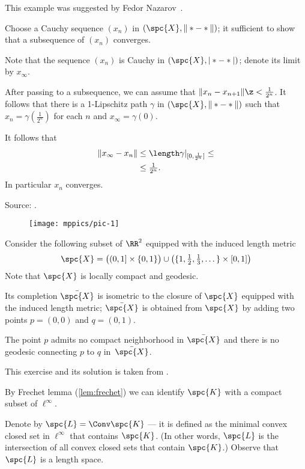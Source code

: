 This example was suggested by Fedor Nazarov~\cite{nazarov}.

Choose a Cauchy sequence $(x_n)$ in $(\spc{X},\|*-*\|)$; it sufficient to show that a subsequence of $(x_n)$ converges.

Note that the sequence $(x_n)$ is Cauchy in $(\spc{X},|*-*|)$;
denote its limit by $x_\infty$.

After passing to a subsequence, we can assume that $\|x_n-x_{n+1}\|\z<\tfrac1{2^n}$.
It follows that there is a 1-Lipschitz path $\gamma$ in $(\spc{X},\|*-*\|)$ such that $x_n=\gamma(\tfrac1{2^n})$ for each $n$ and $x_\infty=\gamma(0)$.

It follows that
\begin{align*}
\|x_\infty-x_n\|&\le \length\gamma|_{[0,\frac1{2^n}]}\le
\\
&\le \tfrac1{2^n}.
\end{align*}
In particular $x_n$ converges.\qeds

Source: \cite[Lemma 2.3]{petrunin-stadler}.


\begin{wrapfigure}{o}{20 mm}
\vskip-0mm
\centering
\texttt{[image: mppics/pic-1]}
\end{wrapfigure}

Consider the following subset of $\RR^2$ equipped with the induced length metric
\[
\spc{X}
=
\bigl((0,1]\times\{0,1\}\bigr)
\cup
\bigl(\{1,\tfrac12,\tfrac13,\dots\}\times[0,1]\bigr)
\]
Note that $\spc{X}$ is locally compact and geodesic.

Its completion $\bar{\spc{X}}$ is isometric to the closure of $\spc{X}$ equipped with the induced length metric;
$\bar{\spc{X}}$ is obtained from $\spc{X}$ by adding two points $p=(0,0)$ and $q=(0,1)$.

The point $p$ admits no compact neighborhood in $\bar{\spc{X}}$ 
and there is no geodesic connecting $p$ to $q$ in~$\bar{\spc{X}}$. \qeds

This exercise and its solution is taken from \cite{bridson-haefliger}.


 By Frechet lemma (\ref{lem:frechet}) we can identify $\spc{K}$ with a compact subset of $\ell^\infty$.

Denote by $\spc{L}=\Conv\spc{K}$ --- it is defined as the minimal convex closed set in $\ell^\infty$ that contains $\spc{K}$.
(In other words, $\spc{L}$ is the intersection of all convex closed sets that contain $\spc{K}$.)
Observe that $\spc{L}$ is a length space.

